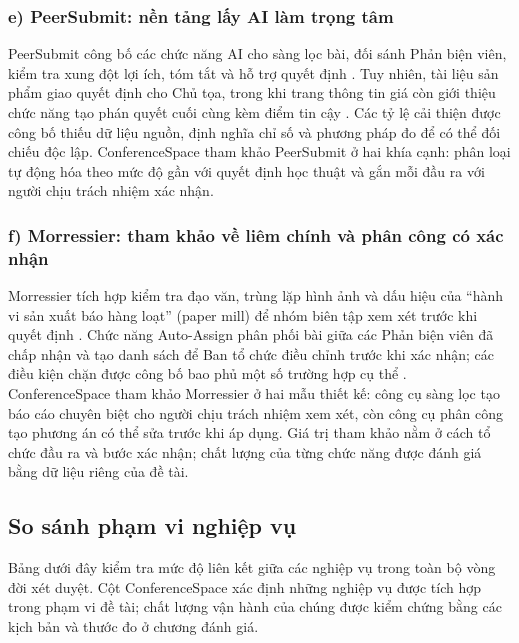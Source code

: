 \subsubsection{e) PeerSubmit: nền tảng lấy AI làm trọng tâm}

PeerSubmit công bố các chức năng AI cho sàng lọc bài, đối sánh Phản biện viên, kiểm tra xung đột lợi ích, tóm tắt và hỗ trợ quyết định \cite{ch2ref48}. Tuy nhiên, tài liệu sản phẩm giao quyết định cho Chủ tọa, trong khi trang thông tin giá còn giới thiệu chức năng tạo phán quyết cuối cùng kèm điểm tin cậy \cite{ch2ref48,ch2ref52,ch2ref54}. Các tỷ lệ cải thiện được công bố thiếu dữ liệu nguồn, định nghĩa chỉ số và phương pháp đo để có thể đối chiếu độc lập. ConferenceSpace tham khảo PeerSubmit ở hai khía cạnh: phân loại tự động hóa theo mức độ gần với quyết định học thuật và gắn mỗi đầu ra với người chịu trách nhiệm xác nhận.

\subsubsection{f) Morressier: tham khảo về liêm chính và phân công có xác nhận}

Morressier tích hợp kiểm tra đạo văn, trùng lặp hình ảnh và dấu hiệu của ``hành vi sản xuất báo hàng loạt'' (paper mill) để nhóm biên tập xem xét trước khi quyết định \cite{ch2ref47}. Chức năng Auto-Assign phân phối bài giữa các Phản biện viên đã chấp nhận và tạo danh sách để Ban tổ chức điều chỉnh trước khi xác nhận; các điều kiện chặn được công bố bao phủ một số trường hợp cụ thể \cite{ch2ref55}. ConferenceSpace tham khảo Morressier ở hai mẫu thiết kế: công cụ sàng lọc tạo báo cáo chuyên biệt cho người chịu trách nhiệm xem xét, còn công cụ phân công tạo phương án có thể sửa trước khi áp dụng. Giá trị tham khảo nằm ở cách tổ chức đầu ra và bước xác nhận; chất lượng của từng chức năng được đánh giá bằng dữ liệu riêng của đề tài.

\subsection{So sánh phạm vi nghiệp vụ}

Bảng dưới đây kiểm tra mức độ liên kết giữa các nghiệp vụ trong toàn bộ vòng đời xét duyệt. Cột ConferenceSpace xác định những nghiệp vụ được tích hợp trong phạm vi đề tài; chất lượng vận hành của chúng được kiểm chứng bằng các kịch bản và thước đo ở chương đánh giá.

